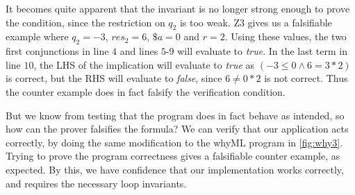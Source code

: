 It becomes quite apparent that the invariant is no longer strong enough to prove the condition, since the restriction on $q_{2}$ is too weak. 
Z3 gives us a falsifiable example where $q_2 = -3$, $res_2 = 6$, $\$a = 0$ and $r=2$.
Using these values, the two first conjunctions in line $4$ and lines $5$-$9$ will evaluate to \textit{true}.
In the last term in line $10$, the LHS of the implication will evaluate to \textit{true} as
$(-3 \leq 0 \land 6 = 3 * 2)$
is correct, but the RHS will evaluate to \textit{false}, since
$6 \neq 0 * 2$
is not correct. Thus the counter example does in fact falsify the verification condition.

But we know from testing that the program does in fact behave as intended, so how can the prover falsifies the formula? 
We can verify that our application acts correctly, by doing the same modification to the whyML program in \cref{fig:why3}.
Trying to prove the program correctness gives a falsifiable counter example, as expected.
By this, we have confidence that our implementation works correctly, and requires the necessary loop invariants.

